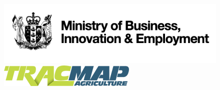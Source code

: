 \documentclass{beamer}
\begin{document}

\begin{frame}
\begin{figure}
\centering
\includegraphics[]{plots/mbie}\\
\includegraphics[]{plots/tracmap-agriculture}
\centering
\end{figure}
\end{frame}



%
%
%
%
%
\end{document}

